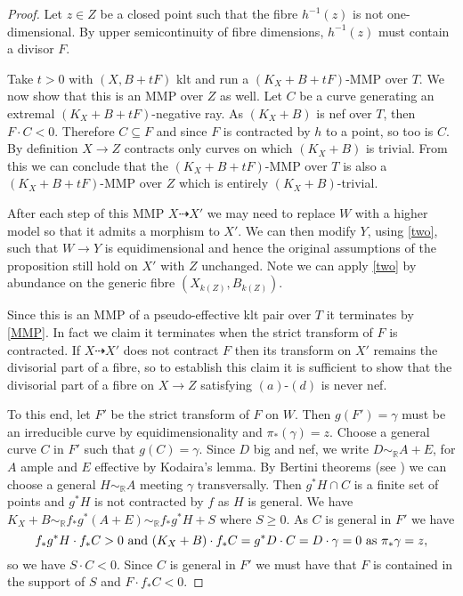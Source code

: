 \documentclass[a4paper,12pt]{book}
\begin{document}
	\begin{proof}
		Let $z \in Z$ be a closed point such that the fibre $h^{-1}(z)$ is not one-dimensional. By upper semicontinuity of fibre dimensions, $h^{-1}(z)$ must contain a divisor $F$.
		
		Take $t >0$ with $(X,B+tF)$ klt and run a $(K_X+B+tF)$-MMP over $T$. 
		We now show that this is an MMP over $Z$ as well.	
		Let $C$ be a curve generating an extremal $(K_X+B+tF)$-negative ray. As $(K_{X}+B)$ is nef over $T$, then $F\cdot C <0$. Therefore $C \subseteq F$ and since $F$ is contracted by $h$ to a point, so too is $C$. By definition $X \to Z$ contracts only curves on which $(K_{X}+B)$ is trivial. From this we can conclude that the $(K_X+B+tF)$-MMP over $T$ is also a $(K_X+B+tF)$-MMP over $Z$ which is entirely $(K_{X}+B)$-trivial.  
		
		After each step of this MMP $X \dashrightarrow X'$ we may need to replace $W$ with a higher model so that it admits a morphism to $X'$. We can then modify $Y$, using \autoref{two}, such that $W \to Y$ is equidimensional and hence the original assumptions of the proposition still hold on $X'$ with $Z$ unchanged. Note we can apply \autoref{two} by abundance on the generic fibre $(X_{k(Z)},B_{k(Z)})$.
		
		Since this is an MMP of a pseudo-effective klt pair over $T$ it terminates by \autoref{MMP}. In fact we claim it terminates when the strict transform of $F$ is contracted. If $X\dashrightarrow X'$ does not contract $F$ then its transform on $X'$ remains the divisorial part of a fibre, so to establish this claim it is sufficient to show that the divisorial part of a fibre on $X \to Z$ satisfying $(a)$-$(d)$ is never nef. 
		
		To this end, let $F'$ be the strict transform of $F$ on $W$. Then $g(F')=\gamma$ must be an irreducible curve by equidimensionality and $\pi_*(\gamma)=z$. Choose a general curve $C$ in $F'$ such that $g(C)=\gamma$.
		Since $D$ big and nef, we write $D\sim_{\mathbb{R}} A+E$, for $A$ ample and $E$ effective by Kodaira's lemma.
		By Bertini theorems (see \cite[Theorem 2.15]{bhatt2020}) we can choose a general $H \sim_{\mathbb{R}} A$ meeting $\gamma$ transversally. 
		Then $g^{*}H \cap C$ is a finite set of points and $g^{*}H$ is not contracted by $f$ as $H$ is general.
		We have $K_{X}+B \sim_{\mathbb{R}}f_{*}g^{*}(A+E) \sim_{\mathbb{R}}f_{*}g^{*}H+S$ where $S \geq 0$. As $C$ is general in $F'$ we have
		$$f_{*}g^{*}H \cdot f_{*}C >0 \textup{ and } (K_{X}+B)\cdot f_{*}C=g^{*}D \cdot C=D \cdot \gamma=0 \text{ as } \pi_*\gamma=z,$$ so we have $S \cdot C <0$. Since $C$ is general in $F'$ we must have that $F$ is contained in the support of $S$ and $F \cdot f_{*}C <0$.
		

\end{proof}
\end{document}
